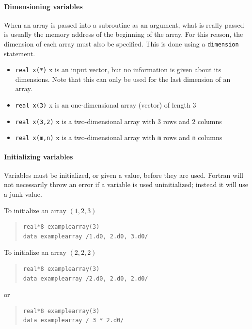 \documentclass[10pt,letterpaper,oneside]{report}
\begin{document}
\paragraph{Dimensioning variables}
When an array is passed into a subroutine as an argument, what is really passed is usually the memory address of the beginning of the array.  For this reason, the dimension of each array must also be specified.  This is done using a \texttt{dimension} statement.
\begin{itemize}
\item \texttt{real x(*)} x is an input vector, but no information is given about its dimensions.  Note that this can only be used for the last dimension of an array.
\item \texttt{real x(3)} x is an one-dimensional array (vector) of length 3
\item \texttt{real x(3,2)} x is a two-dimensional array with 3 rows and 2 columns
\item \texttt{real x(m,n)} x is a two-dimensional array with \texttt{m} rows and \texttt{n} columns 
\end{itemize}

\paragraph{Initializing variables}
Variables must be initialized, or given a value, before they are used.  Fortran will not necessarily throw an error if a variable is used uninitialized; instead it will use a junk value.  

To initialize an array $(1,2,3)$ 
\begin{quote}\begin{lstlisting}
real*8 examplearray(3)
data examplearray /1.d0, 2.d0, 3.d0/
\end{lstlisting}\end{quote}

To initialize an array $(2,2,2)$
\begin{quote}\begin{lstlisting}
real*8 examplearray(3)
data examplearray /2.d0, 2.d0, 2.d0/
\end{lstlisting}\end{quote}
or
\begin{quote}\begin{lstlisting}
real*8 examplearray(3)
data examplearray / 3 * 2.d0/
\end{lstlisting}\end{quote}
\end{document}
